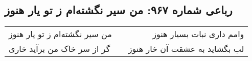 \begin{center}
\section*{رباعی شماره ۹۶۷: من سیر نگشته‌ام ز تو یار هنوز}
\label{sec:0967}
\begin{longtable}{l p{0.5cm} r}
من سیر نگشته‌ام ز تو یار هنوز
&&
وامم داری نبات بسیار هنوز
\\
گر از سر خاک من برآید خاری
&&
لب بگشاید به عشقت آن خار هنوز
\\
\end{longtable}
\end{center}
